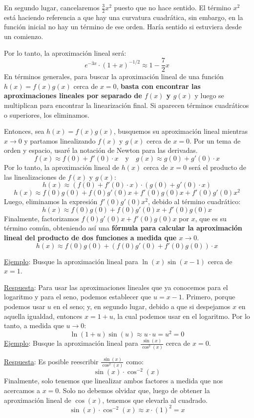 \documentclass[12pt]{article}
\begin{document}
En segundo lugar, cancelaremos $\frac{3}{2}x^{2}$ puesto que no hace sentido. El término $x^{2}$ está haciendo referencia a que hay una curvatura cuadrática, sin embargo, en la función inicial no hay un término de ese orden. Haría sentido si estuviera desde un comienzo.

Por lo tanto, la aproximación lineal será:
\[e^{-3x} \cdot (1 + x)^{-1/2} \approx 1 - \frac{7}{2}x\]
En términos generales, para buscar la aproximación lineal de una función $h(x) = f(x)g(x)$ cerca de $x = 0$, \textbf{basta con encontrar las aproximaciones lineales por separado de $f(x)$ y $g(x)$} y luego se multiplican para encontrar la linearización final. Si aparecen términos cuadráticos o superiores, los eliminamos.

Entonces, sea $h(x) = f(x)g(x)$, busquemos su aproximación lineal mientras $x \to 0$ y partamos linealizando $f(x)$ y $g(x)$ cerca de $x = 0$. Por un tema de orden y espacio, usaré la notación de Newton para las derivadas.
\[f(x) \approx f(0) + f'(0) \cdot x \quad \text{y} \quad g(x) \approx g(0) + g'(0) \cdot x\]
Por lo tanto, la aproximación lineal de $h(x)$ cerca de $x = 0$ será el producto de las linealizaciones de $f(x)$ y $g(x)$:
\[h(x) \approx (f(0) + f'(0) \cdot x) \cdot (g(0) + g'(0) \cdot x)\]
\[h(x) \approx f(0)g(0) + f(0)g'(0)x + f'(0)g(0)x + f'(0)g'(0)x^{2}\]
Luego, eliminamos la expresión $f'(0)g'(0)x^{2}$, debido al término cuadrático:
\[h(x) \approx f(0)g(0) + f(0)g'(0)x + f'(0)g(0)x\]
Finalmente, factorizamos $f(0)g'(0)x + f'(0)g(0)x$ por $x$, que es su término común, obteniendo así una \textbf{fórmula para calcular la aproximación lineal del producto de dos funciones a medida que $x \to 0$}.
\[h(x) \approx f(0)g(0) + (f(0)g'(0) + f'(0)g(0)) \cdot x\]

\underline{Ejemplo}: Busque la aproximación lineal para $\ln(x)\sin(x - 1)$ cerca de $x = 1$.

\underline{Respuesta}: Para usar las aproximaciones lineales que ya conocemos para el logaritmo y para el seno, podemos establecer que $u = x - 1$. Primero, porque podemos usar $u$ en el seno; y, en segundo lugar, debido a que si despejamos $x$ en aquella igualdad, entonces $x = 1 + u$, la cual podemos usar en el logaritmo. Por lo tanto, a medida que $u \to 0$:
\[\ln(1 + u) \sin(u) \approx u \cdot u = u^{2} = 0\]
\underline{Ejemplo}: Busque la aproximación lineal para $\frac{\sin(x)}{\cos^{2}(x)}$ cerca de $x = 0$.

\underline{Respuesta}: Es posible reescribir $\frac{\sin(x)}{\cos^{2}(x)}$ como:
\[\sin(x) \cdot \cos^{-2}(x)\]
Finalmente, solo tenemos que linealizar ambos factores a medida que nos acercamos a $x = 0$. Solo no debemos olvidar que, luego de obtener la aproximación lineal de $\cos(x)$, tenemos que elevarla al cuadrado.
\[\sin(x) \cdot \cos^{-2}(x) \approx x \cdot (1)^{2} = x\]
\end{document}

